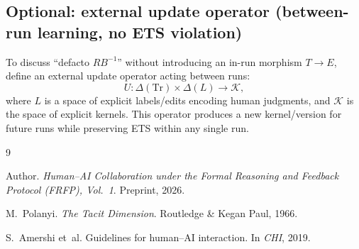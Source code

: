 \documentclass[preprints,article,submit,pdftex,moreauthors,accept]{Definitions/mdpi}
\begin{document}
\subsection{Optional: external update operator (between-run learning, no ETS violation)}
To discuss ``defacto \(RB^{-1}\)'' without introducing an in-run morphism \(T\to E\), define an external update operator acting between runs:
\[
U: \Delta(\mathrm{Tr}) \times \Delta(L)\to \mathcal{K},
\]
where \(L\) is a space of explicit labels/edits encoding human judgments, and \(\mathcal{K}\) is the space of explicit kernels. This operator produces a new kernel/version for future runs while preserving ETS within any single run.

\begin{thebibliography}{9}

Author.
\newblock \emph{Human--AI Collaboration under the Formal Reasoning and Feedback Protocol (FRFP), Vol.~1}.
\newblock Preprint, 2026.

M.~Polanyi.
\newblock \emph{The Tacit Dimension}.
\newblock Routledge \& Kegan Paul, 1966.

S.~Amershi et~al.
\newblock Guidelines for human--AI interaction.
\newblock In \emph{CHI}, 2019.

\end{thebibliography}
\end{document}
